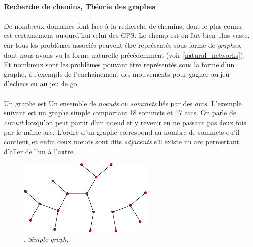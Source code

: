\paragraph{Recherche de chemins, Théorie des graphes}

\paragraph{} De nombreux domaines font face à la recherche de chemins, dont le plus connu est certainement aujourd'hui
celui des GPS. Le champ est en fait bien plus vaste, car tous les problèmes associés peuvent être représentés sous
forme de \emph{graphes}, dont nous avons vu la forme naturelle précédemment (voir \ref{natural_networks}). Et nombreux
sont les problèmes pouvant être représentés sous la forme d'un graphe, à l'exemple de l'enchainement des mouvements pour
gagner au jeu d'echecs ou au jeu de go.

\paragraph{} Un graphe est \guillemotleft Un ensemble de \emph{noeuds} ou \emph{sommets} liés par des \emph{arcs}\guillemotright.
\cite{AI1} L'exemple suivant est un graphe simple comportant 18 sommets et 17 arcs. On parle de \emph{circuit} lorsqu'on
peut partir d'un noeud et y revenir en ne passant pas deux fois par le même arc. L'ordre d'un graphe correspond au nombre
de sommets qu'il contient, et enfin deux n\oe{}uds sont dits \emph{adjacents} s'il existe un arc permettant d'aller de
l'un à l'autre.

\begin{figure}[h]
    \centering
    \includegraphics[width=250px]{chapters/03/images/simple_graph.png}
    \caption{\label{graph}, \emph{Simple graph}, \cite{GraphTheory0}}
\end{figure}

